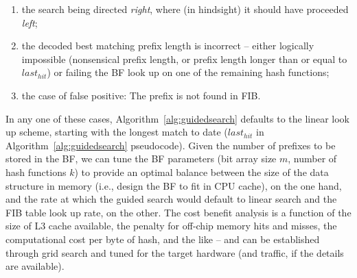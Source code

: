 \documentclass[conference,compsoc]{IEEEtran}
\begin{document}
\begin{enumerate}
  \item the search being directed \emph{right}, where 
    (in hindsight) it should have proceeded \emph{left};
  \item the decoded best matching prefix length is incorrect -- either 
    logically impossible (nonsensical prefix length, or prefix length longer than
    or equal to $last_{hit}$) or failing the BF look up on one of the 
    remaining hash functions;
  \item the case of false positive: The prefix is not found in
    FIB.
\end{enumerate}

In any one of these cases, Algorithm~\ref{alg:guidedsearch} defaults to the linear look up
scheme, starting
with the longest match to date ($last_{hit}$ in Algorithm~\ref{alg:guidedsearch} pseudocode).
Given the number of prefixes to be stored in the BF, we can tune the BF 
parameters (bit array size $m$, number of hash functions $k$) to provide
an optimal balance between the size of the data structure in memory (i.e.,
design the BF to fit in CPU cache), on the one hand, and the rate at which
the guided search would default to linear search and the FIB table look up 
rate, on the other. The cost benefit analysis is a
function of the size of L3 cache available, the penalty for off-chip memory 
hits and misses, the computational cost per byte of hash, and the like --
and can be established through grid search and tuned for the target 
hardware (and traffic, if the details are available).
\end{document}
